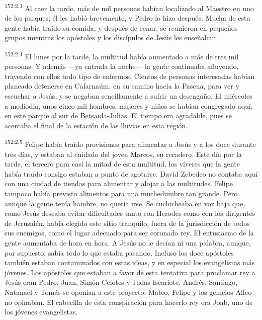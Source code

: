 \par 
\textsuperscript{152:2.3} Al caer la tarde, más de mil personas habían localizado al Maestro en uno de los parques; él les habló brevemente, y Pedro lo hizo después. Mucha de esta gente había traído su comida, y después de cenar, se reunieron en pequeños grupos mientras los apóstoles y los discípulos de Jesús les enseñaban.

\par 
\textsuperscript{152:2.4} El lunes por la tarde, la multitud había aumentado a más de tres mil personas. Y además ---ya entrada la noche--- la gente continuaba afluyendo, trayendo con ellos todo tipo de enfermos. Cientos de personas interesadas habían planeado detenerse en Cafarnaúm, en su camino hacia la Pascua, para ver y escuchar a Jesús, y se negaban sencillamente a sufrir un desengaño. El miércoles a mediodía, unos cinco mil hombres, mujeres y niños se habían congregado aquí, en este parque al sur de Betsaida-Julias. El tiempo era agradable, pues se acercaba el final de la estación de las lluvias en esta región.

\par 
\textsuperscript{152:2.5} Felipe había traído provisiones para alimentar a Jesús y a los doce durante tres días, y estaban al cuidado del joven Marcos, su recadero. Este día por la tarde, el tercero para casi la mitad de esta multitud, los víveres que la gente había traído consigo estaban a punto de agotarse. David Zebedeo no contaba aquí con una ciudad de tiendas para alimentar y alojar a las multitudes. Felipe tampoco había previsto alimentos para una muchedumbre tan grande. Pero aunque la gente tenía hambre, no quería irse. Se cuchicheaba en voz baja que, como Jesús deseaba evitar dificultades tanto con Herodes como con los dirigentes de Jerusalén, había elegido este sitio tranquilo, fuera de la jurisdicción de todos sus enemigos, como el lugar adecuado para ser coronado rey. El entusiasmo de la gente aumentaba de hora en hora. A Jesús no le decían ni una palabra, aunque, por supuesto, sabía todo lo que estaba pasando. Incluso los doce apóstoles también estaban contaminados con estas ideas, y en especial los evangelistas más jóvenes. Los apóstoles que estaban a favor de esta tentativa para proclamar rey a Jesús eran Pedro, Juan, Simón Celotes y Judas Iscariote. Andrés, Santiago, Natanael y Tomás se oponían a este proyecto. Mateo, Felipe y los gemelos Alfeo no opinaban. El cabecilla de esta conspiración para hacerlo rey era Joab, uno de los jóvenes evangelistas.

